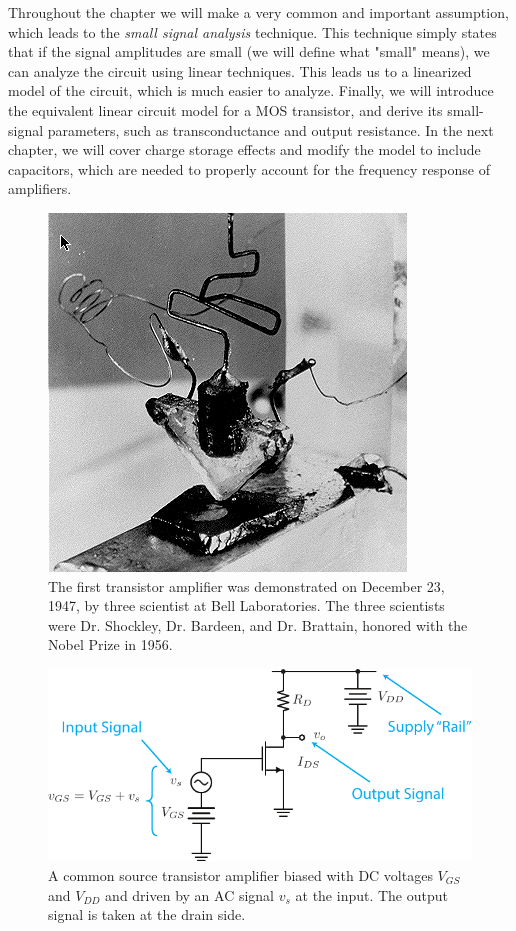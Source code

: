 Throughout the chapter we will make a very common and important assumption, which leads to the \emph{small signal analysis} technique.  This technique simply states that if the signal amplitudes are small (we will define what "small" means), we can analyze the circuit using linear techniques. This leads us to a linearized model of the circuit, which is much easier to analyze.  Finally, we will introduce the equivalent linear circuit model for a MOS transistor, and derive its small-signal parameters, such as transconductance and output resistance.  In the next chapter, we will cover charge storage effects and modify the model to include capacitors, which are needed to properly account for the frequency response of amplifiers.
\begin{figure}[H]
\centering
\includegraphics[width=.25\columnwidth]{bjt_invent.png}
\caption{The first transistor amplifier was demonstrated on December 23, 1947, by three scientist at Bell Laboratories.  The three scientists were Dr. Shockley, Dr. Bardeen, and Dr. Brattain, honored with the Nobel Prize in 1956.}
\label{fig:bjt_invent}
\end{figure}
\newpage
\begin{figure}[t]
\centering
\includegraphics[width=\columnwidth]{csamp_signals}
\caption{A common source transistor amplifier biased with DC voltages $V_{GS}$ and $V_{DD}$ and driven by an AC signal $v_s$ at the input.  The output signal is taken at the drain side.}
\label{fig:csamp_signals}
\end{figure}

